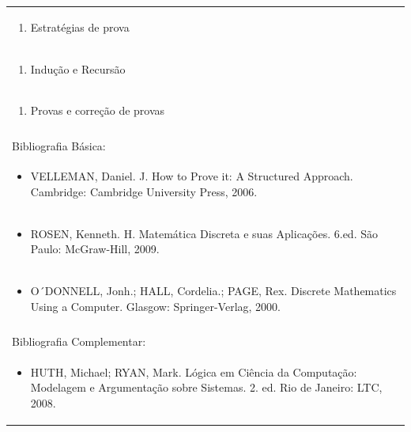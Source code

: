 \documentclass[11pt]{article}
\begin{document}
\begin{center}
\begin{longtable}{|p{4cm}|p{4cm}|p{4cm}|p{4cm}|}
\multicolumn{4}{|p{\dimexpr 16cm + 6\tabcolsep\relax}|}{\begin{enumerate}[start=8]\item Estratégias de prova\end{enumerate}}\\
\multicolumn{4}{|p{\dimexpr 16cm + 6\tabcolsep\relax}|}{\begin{enumerate}[start=9]\item Indução e Recursão\end{enumerate}}\\
\multicolumn{4}{|p{\dimexpr 16cm + 6\tabcolsep\relax}|}{\begin{enumerate}[start=10]\item Provas e correção de provas\end{enumerate}}\\
\multicolumn{4}{|p{\dimexpr 16cm + 6\tabcolsep\relax}|}{}\\
\hline
\multicolumn{4}{|p{16cm}|}{Bibliografia Básica:}\\*
\multicolumn{4}{|p{\dimexpr 16cm + 6\tabcolsep\relax}|}{\begin{itemize}\item VELLEMAN, Daniel. J. How to Prove it: A Structured Approach. Cambridge: Cambridge University Press, 2006.\end{itemize}}\\
\multicolumn{4}{|p{\dimexpr 16cm + 6\tabcolsep\relax}|}{\begin{itemize}\item ROSEN, Kenneth. H. Matemática Discreta e suas Aplicações. 6.ed. São Paulo: McGraw-Hill, 2009.\end{itemize}}\\
\multicolumn{4}{|p{\dimexpr 16cm + 6\tabcolsep\relax}|}{\begin{itemize}\item O´DONNELL, Jonh.; HALL, Cordelia.; PAGE, Rex. Discrete Mathematics Using a Computer. Glasgow: Springer-Verlag, 2000.\end{itemize}}\\
\multicolumn{4}{|p{16cm}|}{}\\
\hline
\multicolumn{4}{|p{16cm}|}{Bibliografia Complementar:}\\*
\multicolumn{4}{|p{\dimexpr 16cm + 6\tabcolsep\relax}|}{\begin{itemize}\item HUTH, Michael; RYAN, Mark. Lógica em Ciência da Computação: Modelagem e Argumentação sobre Sistemas. 2. ed. Rio de Janeiro: LTC, 2008.\end{itemize}}\\

\end{longtable}
\end{center}
\end{document}
